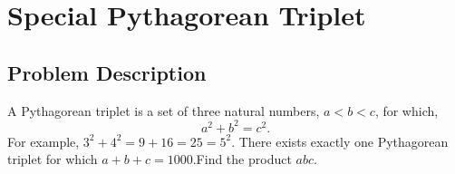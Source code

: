 \chapter{Special Pythagorean Triplet}
\section{Problem Description}
\begin{tcolorbox}
A Pythagorean triplet is a set of three natural numbers, $a < b < c$, for which,
$$a^2 + b^2 = c^2.$$
For example, $3^2 + 4^2 = 9 + 16 = 25 = 5^2$.
There exists exactly one Pythagorean triplet for which $a + b + c = 1000$.Find the product $abc$.
\end{tcolorbox}
